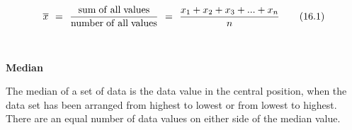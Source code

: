 \begin{description}
\begin{description}
{\begin{equation}
    \overline{x}\phantom{\rule{4pt}{0ex}}=\phantom{\rule{4pt}{0ex}}\frac{\mathrm{sum\; of\; all\; values}}{\mathrm{number\; of\; all\; values}}\phantom{\rule{4pt}{0ex}}=\phantom{\rule{4pt}{0ex}}\frac{{x}_{1}+{x}_{2}+{x}_{3}+...+{x}_{n}}{n}\tag{16.1}
      \end{equation}
    }
    
          
          
          \\\end{description}

	    \item[] \noindent\raggedright {\bf  Median }\\\begin{description}\item{\hspace{.3cm}}\hspace{.3cm}
          \label{m39400*id211687}The median of a set of data is the data value in the central position, when the data set has been arranged from highest to lowest or from lowest to highest. There are an equal number of data values on either side of the median value. \par 
          \\\end{description}


\end{description}

